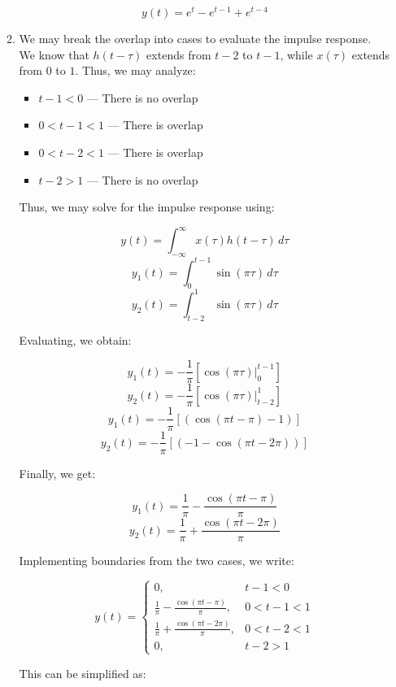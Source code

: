 \begin{enumerate}
\begin{enumerate}
        $$\boxed{y(t)=e^t-e^{t-1}+e^{t-4}}$$

      \item We may break the overlap into cases to evaluate the impulse response. We know that $h(t-\tau)$ extends from $t-2$ to $t-1$, while $x(\tau)$ extends from $0$ to $1$. Thus, we may analyze:

        \begin{itemize}

          \item $t-1 <0$ — There is no overlap

          \item $0<t-1<1$ — There is overlap

          \item $0<t-2<1$ — There is overlap

          \item $t-2>1$ — There is no overlap

        \end{itemize}

        Thus, we may solve for the impulse response using:

        $$y(t)=\int_{-\infty}^{\infty} x(\tau)h(t-\tau)\,d\tau$$
        $$y_1(t)=\int_{0}^{t-1} \sin(\pi \tau)\,d\tau$$
        $$y_2(t)=\int_{t-2}^{1} \sin(\pi\tau)\,d\tau$$
        
        Evaluating, we obtain:

        $$y_1(t)= -\frac{1}{\pi}\left[\cos(\pi \tau)\Big|_0^{t-1}\right]$$
        $$y_2(t)=-\frac{1}{\pi}\left[\cos(\pi\tau)\Big|_{t-2}^1\right]$$
        $$y_1(t)= -\frac{1}{\pi}\left[(\cos(\pi t-\pi)-1)\right]$$
        $$y_2(t)= -\frac{1}{\pi}\left[(-1-\cos(\pi t-2\pi))\right]$$

        Finally, we get:
        
        $$y_1(t)= \frac{1}{\pi}-\frac{\cos(\pi t-\pi)}{\pi}$$
        $$y_2(t)= \frac{1}{\pi}+\frac{\cos(\pi t-2\pi)}{\pi}$$

        Implementing boundaries from the two cases, we write:

        $$y(t)=\left\{\begin{array}{ll} 0, & t-1<0\\\frac{1}{\pi}-\frac{\cos(\pi t-\pi)}{\pi}, & 0<t-1<1\\\frac{1}{\pi}+\frac{\cos(\pi t-2\pi)}{\pi}, & 0<t-2<1\\ 0, & t-2>1\end{array}$$

        This can be simplified as:


\end{enumerate}
\end{enumerate}
